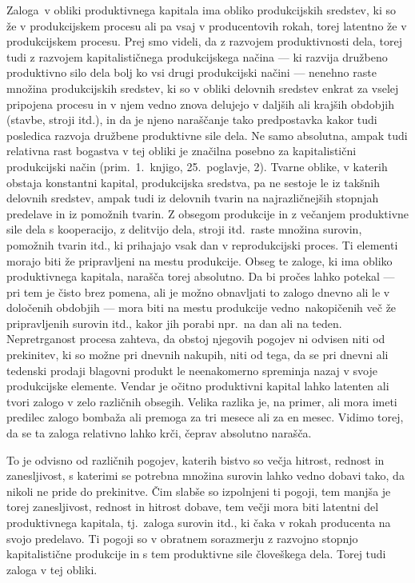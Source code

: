 \documentclass[kapital_02.tex]{subfiles}
\begin{document}
Zaloga\KPEstran\ v obliki produktivnega kapitala ima obliko produkcijskih sredstev, ki so že v produkcijskem procesu ali pa vsaj v producentovih rokah, torej latentno že v produkcijskem procesu.
Prej smo videli, da z razvojem produktivnosti dela, torej tudi z razvojem kapitalističnega produkcijskega načina — ki razvija družbeno produktivno silo dela bolj ko vsi drugi produkcijski načini — nenehno raste množina produkcijskih sredstev, ki so v obliki delovnih sredstev enkrat za vselej pripojena procesu in v njem vedno znova delujejo v daljših ali krajših obdobjih (stavbe, stroji itd.), in da je njeno naraščanje tako predpostavka kakor tudi posledica razvoja družbene produktivne sile dela.
Ne samo absolutna, ampak tudi relativna rast bogastva v tej obliki je značilna posebno za kapitalistični produkcijski način (prim.\ 1.\ knjigo, 25.\ poglavje, 2).
Tvarne oblike, v katerih obstaja konstantni kapital, produkcijska sredstva, pa ne sestoje le iz takšnih delovnih sredstev, ampak tudi iz delovnih tvarin na najrazličnejših stopnjah predelave in iz pomožnih tvarin.
Z obsegom produkcije in z večanjem produktivne sile dela s kooperacijo, z delitvijo dela, stroji itd.\ raste množina surovin, pomožnih tvarin itd., ki prihajajo vsak dan v reprodukcijski proces.
Ti elementi morajo biti že pripravljeni na mestu produkcije. Obseg te zaloge, ki ima obliko produktivnega kapitala, narašča torej absolutno.
Da bi pročes lahko potekal — pri tem je čisto brez pomena, ali je možno obnavljati to zalogo dnevno ali le v določenih obdobjih — mora biti na mestu produkcije vedno\KPEstran\ nakopičenih več že pripravljenih surovin itd., kakor jih porabi npr.\ na dan ali na teden.
Nepretrganost procesa zahteva, da obstoj njegovih pogojev ni odvisen niti od prekinitev, ki so možne pri dnevnih nakupih, niti od tega, da se pri dnevni ali tedenski prodaji blagovni produkt le neenakomerno spreminja nazaj v svoje produkcijske elemente.
Vendar je očitno produktivni kapital lahko latenten ali tvori zalogo v zelo različnih obsegih.
Velika razlika je, na primer, ali mora imeti predilec zalogo bombaža ali premoga za tri mesece ali za en mesec.
Vidimo torej, da se ta zaloga relativno lahko krči, čeprav absolutno narašča.

To je odvisno od različnih pogojev, katerih bistvo so večja hitrost, rednost in zanesljivost, s katerimi se potrebna množina surovin lahko vedno dobavi tako, da nikoli ne pride do prekinitve.
Čim slabše so izpolnjeni ti pogoji, tem manjša je torej zanesljivost, rednost in hitrost dobave, tem večji mora biti latentni del produktivnega kapitala, tj.\ zaloga surovin itd., ki čaka v rokah producenta na svojo predelavo.
Ti pogoji so v obratnem sorazmerju z razvojno stopnjo kapitalistične produkcije in s tem produktivne sile človeškega dela.
Torej tudi zaloga v tej obliki.
\end{document}
